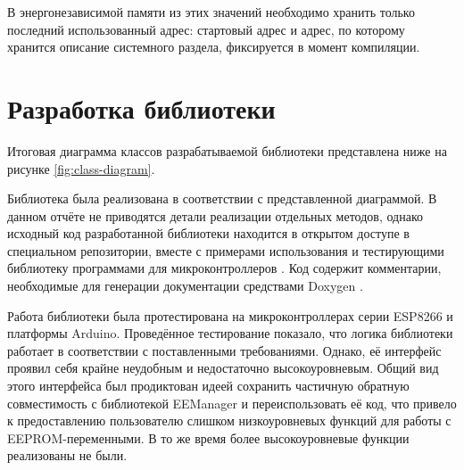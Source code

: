 В энергонезависимой памяти из этих значений необходимо хранить только последний использованный адрес: стартовый адрес и адрес, по которому хранится описание системного раздела, фиксируется в момент компиляции.

\section{Разработка библиотеки}

Итоговая диаграмма классов разрабатываемой библиотеки представлена ниже на рисунке \ref{fig:class-diagram}.



Библиотека была реализована в соответствии с представленной диаграммой.
В данном отчёте не приводятся детали реализации отдельных методов, однако исходный код разработанной библиотеки находится в открытом доступе в специальном репозитории, вместе с примерами использования и тестирующими библиотеку программами для микроконтроллеров \cite{web:my-eemanager}.
Код содержит комментарии, необходимые для генерации документации средствами Doxygen \cite{web:doxygen}.

Работа библиотеки была протестирована на микроконтроллерах серии ESP8266 и платформы Arduino.
Проведённое тестирование показало, что логика библиотеки работает в соответствии с поставленными требованиями.
Однако, её интерфейс проявил себя крайне неудобным и недостаточно высокоуровневым.
Общий вид этого интерфейса был продиктован идеей сохранить частичную обратную совместимость с библиотекой EEManager и переиспользовать её код, что привело к предоставлению пользователю слишком низкоуровневых функций для работы с EEPROM-переменными.
В то же время более высокоуровневые функции реализованы не были.

